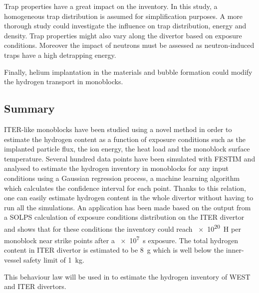 Trap properties have a great impact on the inventory.
In this study, a homogeneous trap distribution is assumed for simplification purposes.
A more thorough study could investigate the influence on trap distribution, energy and density.
Trap properties might also vary along the divertor based on exposure conditions.
Moreover the impact of neutrons must be assessed as neutron-induced traps have a high detrapping energy.



Finally, helium implantation in the materials and bubble formation could modify the hydrogen transport in monoblocks.

\subsection{Summary}
ITER-like monoblocks have been studied using a novel method in order to estimate the hydrogen content as a function of exposure conditions such as the implanted particle flux, the ion energy, the heat load and the monoblock surface temperature.
Several hundred data points have been simulated with FESTIM and analysed to estimate the hydrogen inventory in monoblocks for any input conditions using a Gaussian regression process, a machine learning algorithm which calculates the confidence interval for each point.
Thanks to this relation, one can easily estimate hydrogen content in the whole divertor without having to run all the simulations.
An application has been made based on the output from a SOLPS calculation of exposure conditions distribution on the ITER divertor and shows that for these conditions the inventory could reach \SI{e20}{H} per monoblock near strike points after a \SI{e7}{s} exposure.
The total hydrogen content in ITER divertor is estimated to be \SI{8}{g} which is well below the inner-vessel safety limit of \SI{1}{kg}.

This behaviour law will be used in  to estimate the hydrogen inventory of WEST and ITER divertors.
